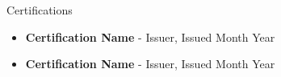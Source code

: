 \begin{rSection}{Certifications}
  \begin{itemize}
      \item \textbf{Certification Name} - Issuer, Issued Month Year
      \item \textbf{Certification Name} - Issuer, Issued Month Year
  \end{itemize}
\end{rSection}
